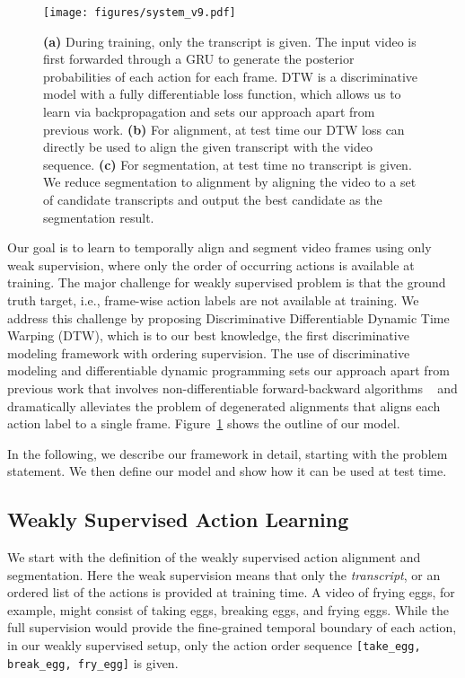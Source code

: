 \documentclass[10pt,twocolumn,letterpaper]{article}
\newcommand{\dttw}{DTW\xspace}
\begin{document}
\begin{figure}[tb]
\centering
\texttt{[image: figures/system\_v9.pdf]}
   \vspace{-2mm}
   \caption{
      \textbf{(a)} During training, only the transcript  is given. The input video is first forwarded through a GRU to generate the posterior probabilities  of each action for each frame. \dttw is a discriminative model with a fully differentiable loss function, which allows us to learn  via backpropagation and sets our approach apart from previous work. \textbf{(b)} For alignment, at test time our \dttw loss can directly be used to align the given transcript  with the video sequence.  \textbf{(c)} For segmentation, at test time no transcript is given. We reduce segmentation to alignment by aligning the video to a set of candidate transcripts  and output the best candidate as the segmentation result. 
   }
   \vspace{-1mm}
\label{fig:system_v2}
\end{figure}



Our goal is to learn to temporally align and segment video frames using only weak supervision, where only the order of occurring actions is available at training.
The major challenge for weakly supervised problem is that the ground truth target, i.e., frame-wise action labels are not available at training. We address this challenge by proposing Discriminative  Differentiable  Dynamic Time Warping (\dttw), which is to our best knowledge, the first discriminative modeling framework with ordering supervision. The use of discriminative modeling and differentiable dynamic programming sets our approach apart from previous work that involves non-differentiable forward-backward algorithms ~\cite{graves2006connectionist, huang2016connectionist, richard2018neuralnetwork} and dramatically alleviates the problem of degenerated alignments that aligns each action label to a single frame. Figure~\ref{fig:system_v2} shows the outline of our model.

In the following, we describe our framework in detail, starting with the problem statement. We then define our model and show how it can be used at test time. 


\subsection{Weakly Supervised Action Learning}

We start with the definition of the weakly supervised action alignment and segmentation. Here the weak supervision means that only the \emph{transcript}, or an ordered list of the actions is provided at training time. A video of frying eggs, for example, might consist of taking eggs, breaking eggs, and frying eggs. While the full supervision would provide the fine-grained temporal boundary of each action, in our weakly supervised setup, only the action order sequence \verb|[take_egg, break_egg, fry_egg]| is given. 
\end{document}
